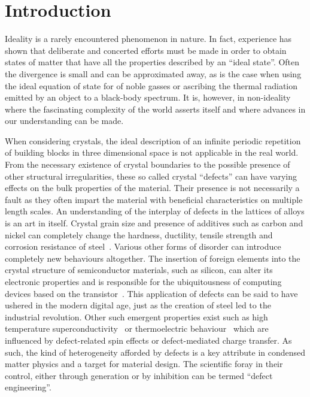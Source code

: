 
\section{Introduction}

Ideality is a rarely encountered phenomenon in nature. In fact,
experience has shown that deliberate and concerted efforts 
must be made in order to obtain states of matter that have all
the properties described by an ``ideal state''.
Often the divergence is small and can be approximated 
away, as is the case when using the ideal equation of state for 
of noble gasses or ascribing the thermal radiation emitted by an object
to a black-body spectrum. It is, however, in non-ideality where the 
fascinating complexity of the world asserts itself and where 
advances in our understanding can be made. 

When considering crystals, the ideal description of an infinite
periodic repetition of building blocks in three dimensional space is
not applicable in the real world. From the necessary existence of 
crystal boundaries to the possible presence of other structural
irregularities, these so called crystal ``defects'' can have
varying effects on the bulk properties of the material.
Their presence is not necessarily a fault as
they often impart the material with beneficial characteristics
on multiple length scales.
An understanding of the interplay of defects in the 
lattices of alloys is an art in itself.
Crystal grain size and presence of additives such as 
carbon and nickel can completely change the hardness, 
ductility, tensile strength and corrosion resistance
of steel~\cite{reed-hillPhysicalMetallurgyPrinciples1992}. 
Various other forms 
of disorder can introduce completely new behaviours altogether.
The insertion of foreign elements into the crystal structure
of semiconductor materials, such as silicon, can alter its 
electronic properties and is responsible for the ubiquitousness
of computing devices based on the 
transistor~\cite{levyMicroelectronicMaterialsProcesses1989}. 
This application
of defects can be said to have ushered in the modern digital age,
just as the creation of steel led to the industrial revolution.
Other such emergent properties exist such as high temperature 
superconductivity~\cite{leggettWhatWeKnow2006} or thermoelectric 
behaviour~\cite{peiBandEngineeringThermoelectric2012} which are influenced
by defect-related spin effects or defect-mediated charge transfer.
As such, the kind of heterogeneity afforded by defects is a key attribute 
in condensed matter physics and a target for material design.
The scientific foray in their control, either through generation or
by inhibition can be termed ``defect engineering''.

